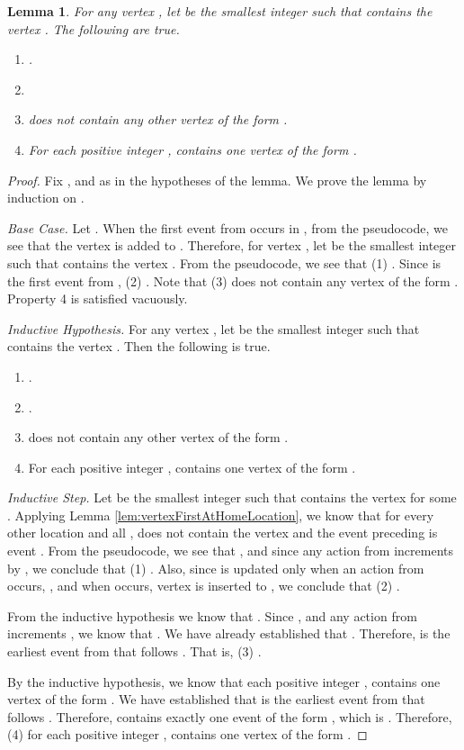 \documentclass[11pt]{article}
\numberwithin{theorem}{section}
\newtheorem{lemma}[theorem]{Lemma}
\begin{document}
 \begin{lemma}\label{lem:vertexInsertionProp}
 For any vertex , let  be the smallest integer such that  contains the vertex .
The following are true.
\begin{enumerate}
\item .
\item 
\item  does not contain any other vertex of the form .
\item For each positive integer ,  contains one vertex of the form .
\end{enumerate}
\end{lemma}
\begin{proof}
Fix ,  and  as in the hypotheses of the lemma. We prove the lemma by induction on .

\emph{Base Case.} Let . When the first event  from 
occurs in , from the pseudocode, we see that the vertex
 is added to . Therefore, for vertex , let 
be the smallest integer such that  contains the
vertex . From the pseudocode, we see that (1) .
Since  is the first event from , (2) . Note that (3)  does not contain any vertex of the form . Property 4 is satisfied vacuously.

\emph{Inductive Hypothesis.}  For any vertex , let  be the
smallest integer such that  contains the vertex
. Then the following is true.
\begin{enumerate}
\item .
\item .
\item  does not contain any other vertex of the form .
\item For each positive integer ,  contains one vertex of the form .
\end{enumerate}

\emph{Inductive Step.} 
Let  be the smallest integer such that  contains the vertex
 for some . Applying Lemma \ref{lem:vertexFirstAtHomeLocation}, we know that for every other location  and all ,  does not contain the vertex  and the event preceding  is event .
From the pseudocode, we see that , and since any action from  increments  by , we conclude that (1) . Also, since  is updated only when an action from  occurs, , and when  occurs, vertex  is inserted to , we conclude that (2) . 

From the inductive hypothesis we know that . Since , and any action from  increments , we know that . We have already established that . Therefore,  is the earliest event from  that follows . That is, (3) .

By the inductive hypothesis, we know that each positive integer ,  contains one vertex of the form . We have established that  is the earliest event from  that follows . Therefore,  contains exactly one event of the form , which is . Therefore, (4) for each positive integer ,  contains one vertex of the form .
\end{proof}
 
\end{document}
